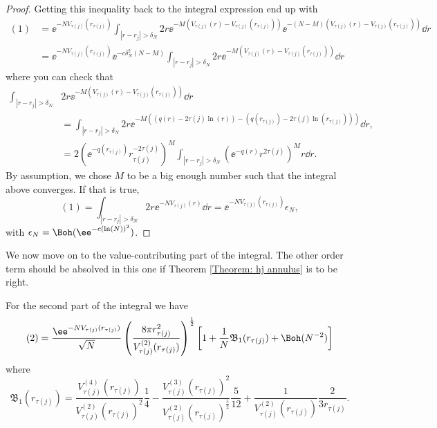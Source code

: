 \begin{proof}
	Getting this inequality back to the integral expression end up with
	\begin{align}
		(1) & =  \ee^{-N V_{\tau(j)}(r_{\tau(j)})} \int_{|r - r_j| > \delta_N} 2r \ee^{-M \left( V_{\tau(j)}(r) - V_{\tau(j)}(r_{\tau(j)}) \right)}  \ee^{-(N-M) \left( V_{\tau(j)}(r) - V_{\tau(j)}(r_{\tau(j)}) \right)} \dd r \\
		& = \ee^{-N V_{\tau(j)}(r_{\tau(j)})}  \ee^{- c \delta_N^2 (N - M)} \int_{|r - r_j| > \delta_N} 2r \ee^{-M \left( V_{\tau(j)}(r) - V_{\tau(j)}(r_{\tau(j)}) \right)} \dd r
	\end{align}
	where you can check that
	\begin{align}
		\int_{|r - r_j| > \delta_N} & 2r \ee^{-M \left( V_{\tau(j)}(r) - V_{\tau(j)}(r_{\tau(j)}) \right)} \dd r\\ 
		& = \int_{|r - r_j| > \delta_N} 2r \ee^{-M \left( (q(r) - 2 \tau(j) \ln(r)) - (q(r_{\tau(j)}) - 2 \tau(j) \ln(r_{\tau(j)})) \right)} \dd r,  \\
		& = 2 \left( \ee^{-q(r_{\tau(j)})} r_{\tau(j)}^{-2 \tau(j)} \right)^M \int_{|r - r_j| > \delta_N} \left( \ee^{-q(r)} r^{2 \tau(j)} \right)^M r \dd r.
	\end{align}
	By assumption, we chose $M$ to be a big enough number such that the integral above converges. If that is true, 
	\begin{equation}
		(1) = \int_{|r - r_j| > \delta_N} 2r \ee^{-N V_{\tau(j)}(r)} \dd r = \ee^{-N V_{\tau(j)}(r_{\tau(j)})} \epsilon_N,
	\end{equation}
	with $\epsilon_N = \Boh(\ee^{-c(\ln(N))^2})$.  
\end{proof}
	
We now move on to the value-contributing part of the integral. The other order term should be absolved in this one if Theorem \ref{Theorem: hj annulus} is to be right.
	
\begin{lema}
		For the second part of the integral we have
		\begin{equation}
			(2) =  \frac{\ee^{-N V_{\tau(j)}(r_{\tau(j)})}}{\sqrt{N}} \left( \frac{8\pi r_{\tau(j)}^2}{V^{(2)}_{\tau(j)}(r_{\tau(j)})} \right)^{\frac{1}{2}} \left[ 1 + \frac{1}{N} \mathfrak{B}_1(r_{\tau(j)}) + \Boh(N^{-2}) \right]
			\label{Equation: main part annulus}
		\end{equation}
		where
		\begin{equation}
			\mathfrak{B}_1(r_{\tau(j)})  = \frac{V^{(4)}_{\tau(j)}(r_{\tau(j)})}{V^{(2)}_{\tau(j)}(r_{\tau(j)})^2} \frac{1}{4} - \frac{V^{(3)}_{\tau(j)}(r_{\tau(j)})^2}{V^{(2)}_{\tau(j)}(r_{\tau(j)})^{\frac{5}{2}}} \frac{5}{12} + \frac{1}{V^{(2)}_{\tau(j)}(r_{\tau(j)})} \frac{2}{3 r_{\tau(j)}}.
		\end{equation}
	\label{Lema: value annulus}
\end{lema}	

